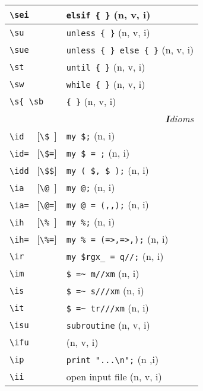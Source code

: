 \documentclass[oneside,10pt,landscape,DIV17]{scrartcl}
\begin{document}
\begin{multicols}{3}
\begin{center}
\begin{tabular}[]{|p{18mm}|p{49mm}|}
\hline \verb'\sei'     & \verb'elsif { }'             \hfill (n, v, i)\\
\hline \verb'\su'      & \verb'unless { }'            \hfill (n, v, i)\\
\hline \verb'\sue'     & \verb'unless { } else { }'   \hfill (n, v, i)\\
\hline \verb'\st'      & \verb'until { }'             \hfill (n, v, i)\\
\hline \verb'\sw'      & \verb'while { }'             \hfill (n, v, i)\\
\hline \verb'\s{ \sb'  & \verb'{ }'                   \hfill (n, v, i)\\
\hline
\hline
\multicolumn{2}{|r|}{\textsl{\textbf{I}dioms}}                 \\[1.0ex]
\hline \verb'\id  ' [\verb'\$ ']  & \verb'my $;'              \hfill (n, i)   \\
\hline \verb'\id= ' [\verb'\$=']  & \verb'my $ = ;'           \hfill (n, i)   \\
\hline \verb'\idd ' [\verb'\$$']  & \verb'my ( $, $ );'       \hfill (n, i)   \\
\hline \verb'\ia  ' [\verb'\@ ']  & \verb'my @;'              \hfill (n, i)   \\
\hline \verb'\ia= ' [\verb'\@=']  & \verb'my @ = (,,);'       \hfill (n, i)   \\
\hline \verb'\ih  ' [\verb'\% ']  & \verb'my %;'              \hfill (n, i)   \\
\hline \verb'\ih= ' [\verb'\%=']  & \verb'my % = (=>,=>,);'   \hfill (n, i)   \\
%
\hline \verb'\ir'  & \verb'my $rgx_ = q//;'    \hfill (n, i)   \\
\hline \verb'\im'  & \verb'$ =~ m//xm'         \hfill (n, i)   \\
\hline \verb'\is'  & \verb'$ =~ s///xm'        \hfill (n, i)   \\
\hline \verb'\it'  & \verb'$ =~ tr///xm'       \hfill (n, i)   \\
\hline \verb'\isu' & \verb'subroutine'         \hfill (n, v, i)\\
       \verb'\ifu' &                           \hfill (n, v, i)\\
\hline \verb'\ip'  & \verb'print "...\n";'     \hfill (n ,i)   \\
\hline \verb'\ii'  & open input file           \hfill (n, v, i)\\

\end{tabular}
\end{center}
\end{multicols}
\end{document}
